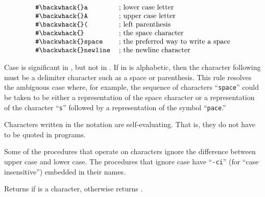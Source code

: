 $$
\begin{tabular}{ll}
{\tt \#\backwhack{}a}&; lower case letter\\
{\tt \#\backwhack{}A}&; upper case letter\\
{\tt \#\backwhack{}(}&; left parenthesis\\
{\tt \#\backwhack{} }&; the space character\\
{\tt \#\backwhack{}space}&; the preferred way to write a space\\
{\tt \#\backwhack{}newline}&; the newline character\\
\end{tabular}
$$

Case is significant in \sharpsign\backwhack{}, but not in
\sharpsign\backwhack{}.  If  in
\sharpsign\backwhack{} is alphabetic, then the character
following  must be a delimiter character such as a
space or parenthesis.  This rule resolves the ambiguous case where, for
example, the sequence of characters ``{\tt\sharpsign\backwhack space}''
could be taken to be either a representation of the space character or a
representation of the character ``{\tt\sharpsign\backwhack s}'' followed
by a representation of the symbol ``{\tt pace}.''

Characters written in the \sharpsign\backwhack{} notation are self-evaluating.
That is, they do not have to be quoted in programs.  

\vest Some of the procedures that operate on characters ignore the
difference between upper case and lower case.  The procedures that
ignore case have \hbox{``{\tt -ci}''} (for ``case
insensitive'') embedded in their names.


\begin{entry}{%
}

Returns \schtrue{} if  is a character, otherwise returns \schfalse.

\end{entry}


